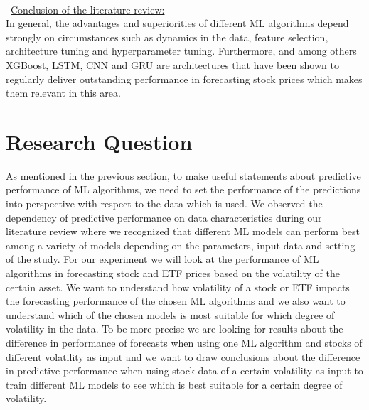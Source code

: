 \documentclass[a4paper,12pt]{report}
\begin{document}
\\\
\underline{Conclusion of the literature review:} \\
In general, the advantages and superiorities of different ML algorithms depend strongly on circumstances such as dynamics in the data, feature selection, architecture tuning and hyperparameter tuning. Furthermore, and among others XGBoost, LSTM, CNN and GRU are architectures that have been shown to regularly deliver outstanding performance in forecasting stock prices which makes them relevant in this area.

\chapter{Research Question}
As mentioned in the previous section, to make useful statements about predictive performance of ML algorithms, we need to set the performance of the predictions into perspective with respect to the data which is used. We observed the dependency of predictive performance on data characteristics during our literature review where we recognized that different ML models can perform best among a variety of models depending on the parameters, input data and setting of the study. For our experiment we will look at the performance of ML algorithms in forecasting stock and ETF prices based on the volatility of the certain asset. We want to understand how volatility of a stock or ETF impacts the forecasting performance of the chosen ML algorithms and we also want to understand which of the chosen models is most suitable for which degree of volatility in the data. To be more precise we are looking for results about the difference in performance of forecasts when using one ML algorithm and stocks of different volatility as input and we want to draw conclusions about the difference in predictive performance when using stock data of a certain volatility as input to train different ML models to see which is best suitable for a certain degree of volatility.
\end{document}
